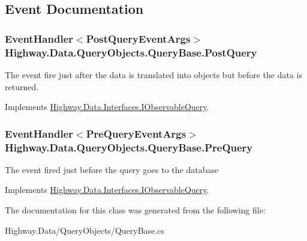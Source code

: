 \subsection{Event Documentation}
\hypertarget{class_highway_1_1_data_1_1_query_objects_1_1_query_base_a75da4f1ac849eac015645365f982a9ff}{
\subsubsection[{Post\-Query}]{\setlength{\rightskip}{0pt plus 5cm}Event\-Handler$<${\bf Post\-Query\-Event\-Args}$>$ Highway.\-Data.\-Query\-Objects.\-Query\-Base.\-Post\-Query}}\label{class_highway_1_1_data_1_1_query_objects_1_1_query_base_a75da4f1ac849eac015645365f982a9ff}


The event fire just after the data is translated into objects but before the data is returned. 



Implements \hyperlink{interface_highway_1_1_data_1_1_interfaces_1_1_i_observable_query_ac8cff5ce936c3611f965796ba9707c49}{Highway.\-Data.\-Interfaces.\-I\-Observable\-Query}.

\hypertarget{class_highway_1_1_data_1_1_query_objects_1_1_query_base_a0f4a7c6fcd8e32c461633855ed00f824}{
\subsubsection[{Pre\-Query}]{\setlength{\rightskip}{0pt plus 5cm}Event\-Handler$<${\bf Pre\-Query\-Event\-Args}$>$ Highway.\-Data.\-Query\-Objects.\-Query\-Base.\-Pre\-Query}}\label{class_highway_1_1_data_1_1_query_objects_1_1_query_base_a0f4a7c6fcd8e32c461633855ed00f824}


The event fired just before the query goes to the database 



Implements \hyperlink{interface_highway_1_1_data_1_1_interfaces_1_1_i_observable_query_a1687e8dccf74ef87f98fe8ef6f1c99c3}{Highway.\-Data.\-Interfaces.\-I\-Observable\-Query}.



The documentation for this class was generated from the following file\-:\begin{DoxyCompactItemize}
\item 
Highway.\-Data/\-Query\-Objects/Query\-Base.\-cs\end{DoxyCompactItemize}
